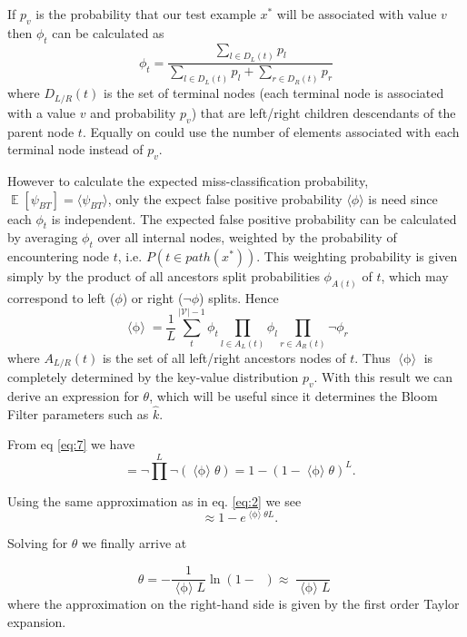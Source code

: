 \documentclass[12pt]{article}
\DeclareMathOperator*{\E}{\mathbb{E}}
\DeclareMathOperator*{\epsi}{ \langle \psi_{BT} \rangle}
\DeclareMathOperator*{\ephi}{ \langle \phi \rangle}
\begin{document}
If $p_v$ is the probability that our test example $x^*$ will be associated with value $v$ then $\phi_t$ can be calculated as
\begin{equation}
\phi_t = \frac{\sum_{l \in D_L(t)} p_l}{ \sum_{l \in D_L(t)} p_l + \sum_{r \in D_R(t)} p_r}
\end{equation}
where $D_{L/R}(t)$ is the set of terminal nodes (each terminal node is associated with a value $v$ and probability $p_v$) that are left/right children descendants of the parent node $t$. Equally on could use the number of elements associated with each terminal node instead of $p_v$.

However to calculate the expected miss-classification probability, $\E[\psi_{BT}] = \langle \psi_{BT} \rangle$, only the expect false positive probability $\langle \phi \rangle$ is need since each $\phi_t$ is independent. The expected false positive probability can be calculated by averaging $\phi_t$ over all internal nodes, weighted by the probability of encountering node $t$, i.e. $P(t \in path(x^*))$. This weighting probability is given simply by the product of all ancestors split probabilities $\phi_{A(t)}$ of $t$, which may correspond to left ($\phi$) or right ($\lnot \phi$) splits. Hence  
\begin{equation} \label{eq:9}
\ephi = \frac{1}{L} \sum_t^{|\mathcal{V}| -1} \phi_t \prod_{l \in A_L(t)} \phi_l \prod_{r \in A_R(t)} \lnot \phi_r
\end{equation}
where $A_{L/R}(t)$ is the set of all left/right ancestors nodes of $t$. Thus $\ephi$ is completely determined by the key-value distribution $p_v$. With this result we can derive an expression for $\theta$, which will be useful since it determines the Bloom Filter parameters such as $\hat{k}$.

From eq \ref{eq:7} we have
\begin{equation}
 \epsi =  \lnot \prod^L \lnot (\ephi \theta)  = 1 - (1 - \ephi \theta)^L.
 \end{equation}
 
 Using the same approximation as in eq. \ref{eq:2} we see
\begin{equation}
\epsi \approx 1 - e^{\ephi \theta L}. 
\end{equation}

Solving for $\theta$ we finally arrive at

\begin{equation} \label{eq:12}
\theta = - \frac{1}{\ephi L} \ln ( 1 - \epsi) \approx \frac{\epsi}{\ephi L}
\end{equation}
where the approximation on the right-hand side is given by the first order Taylor expansion. 
\end{document}
